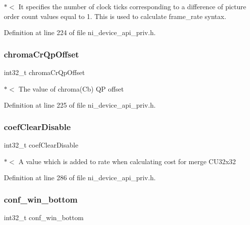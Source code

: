 $\ast$$<$ It specifies the number of clock ticks corresponding to a difference of picture order count values equal to 1. This is used to calculate frame\+\_\+rate syntax. 

Definition at line 224 of file ni\+\_\+device\+\_\+api\+\_\+priv.\+h.

\mbox{\label{struct__ni__t408__config__t_ae1c87e6385e22b1c0dce6ecf8449c935}} 
\subsubsection{\texorpdfstring{chromaCrQpOffset}{chromaCrQpOffset}}
{\footnotesize\ttfamily int32\+\_\+t chroma\+Cr\+Qp\+Offset}

$\ast$$<$ The value of chroma(\+Cb) QP offset 

Definition at line 225 of file ni\+\_\+device\+\_\+api\+\_\+priv.\+h.

\mbox{\label{struct__ni__t408__config__t_a151adce8649da863c632b68124743c22}} 
\subsubsection{\texorpdfstring{coefClearDisable}{coefClearDisable}}
{\footnotesize\ttfamily int32\+\_\+t coef\+Clear\+Disable}

$\ast$$<$ A value which is added to rate when calculating cost for merge C\+U32x32 

Definition at line 286 of file ni\+\_\+device\+\_\+api\+\_\+priv.\+h.

\mbox{\label{struct__ni__t408__config__t_a9797f2600ca1736cf53756aab35a84aa}} 
\subsubsection{\texorpdfstring{conf\_win\_bottom}{conf\_win\_bottom}}
{\footnotesize\ttfamily int32\+\_\+t conf\+\_\+win\+\_\+bottom}

